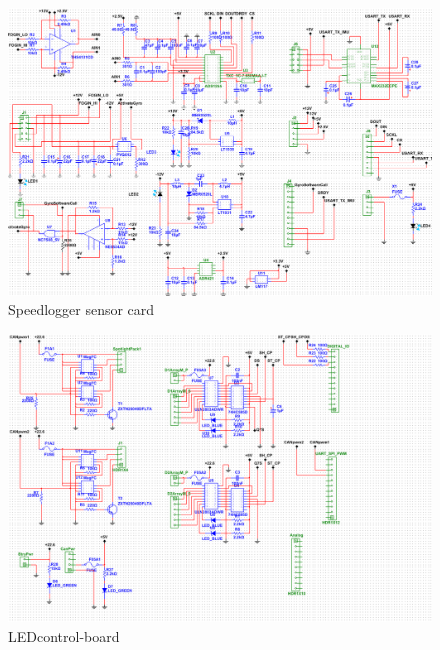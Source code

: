 
\begin{figure}[!ht]
	\begin{center}
		\includegraphics[width=\textwidth]{./Images/Powerboard_Scematics/INS_schematics.png}
		\caption{Speedlogger sensor card}
	\end{center}
\end{figure}


 \begin{figure}[!ht]
	\begin{center}
		\includegraphics[width=\textwidth]{./Images/Powerboard_Scematics/LED_schematics.png}
		\caption{LEDcontrol-board}
	\end{center}
\end{figure}

